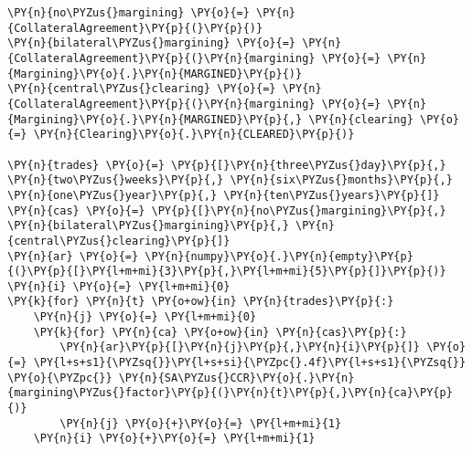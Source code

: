 \begin{tcolorbox}[breakable, size=fbox, boxrule=1pt, pad at break*=1mm,colback=cellbackground, colframe=cellborder]
\begin{Verbatim}[commandchars=\\\{\}]
\PY{n}{no\PYZus{}margining} \PY{o}{=} \PY{n}{CollateralAgreement}\PY{p}{(}\PY{p}{)}
\PY{n}{bilateral\PYZus{}margining} \PY{o}{=} \PY{n}{CollateralAgreement}\PY{p}{(}\PY{n}{margining} \PY{o}{=} \PY{n}{Margining}\PY{o}{.}\PY{n}{MARGINED}\PY{p}{)}
\PY{n}{central\PYZus{}clearing} \PY{o}{=} \PY{n}{CollateralAgreement}\PY{p}{(}\PY{n}{margining} \PY{o}{=} \PY{n}{Margining}\PY{o}{.}\PY{n}{MARGINED}\PY{p}{,} \PY{n}{clearing} \PY{o}{=} \PY{n}{Clearing}\PY{o}{.}\PY{n}{CLEARED}\PY{p}{)}

\PY{n}{trades} \PY{o}{=} \PY{p}{[}\PY{n}{three\PYZus{}day}\PY{p}{,} \PY{n}{two\PYZus{}weeks}\PY{p}{,} \PY{n}{six\PYZus{}months}\PY{p}{,} \PY{n}{one\PYZus{}year}\PY{p}{,} \PY{n}{ten\PYZus{}years}\PY{p}{]}
\PY{n}{cas} \PY{o}{=} \PY{p}{[}\PY{n}{no\PYZus{}margining}\PY{p}{,} \PY{n}{bilateral\PYZus{}margining}\PY{p}{,} \PY{n}{central\PYZus{}clearing}\PY{p}{]}
\PY{n}{ar} \PY{o}{=} \PY{n}{numpy}\PY{o}{.}\PY{n}{empty}\PY{p}{(}\PY{p}{[}\PY{l+m+mi}{3}\PY{p}{,}\PY{l+m+mi}{5}\PY{p}{]}\PY{p}{)}
\PY{n}{i} \PY{o}{=} \PY{l+m+mi}{0}
\PY{k}{for} \PY{n}{t} \PY{o+ow}{in} \PY{n}{trades}\PY{p}{:}
    \PY{n}{j} \PY{o}{=} \PY{l+m+mi}{0}
    \PY{k}{for} \PY{n}{ca} \PY{o+ow}{in} \PY{n}{cas}\PY{p}{:}
        \PY{n}{ar}\PY{p}{[}\PY{n}{j}\PY{p}{,}\PY{n}{i}\PY{p}{]} \PY{o}{=} \PY{l+s+s1}{\PYZsq{}}\PY{l+s+si}{\PYZpc{}.4f}\PY{l+s+s1}{\PYZsq{}} \PY{o}{\PYZpc{}} \PY{n}{SA\PYZus{}CCR}\PY{o}{.}\PY{n}{margining\PYZus{}factor}\PY{p}{(}\PY{n}{t}\PY{p}{,}\PY{n}{ca}\PY{p}{)}
        \PY{n}{j} \PY{o}{+}\PY{o}{=} \PY{l+m+mi}{1}
    \PY{n}{i} \PY{o}{+}\PY{o}{=} \PY{l+m+mi}{1}
\end{Verbatim}
\end{tcolorbox}

